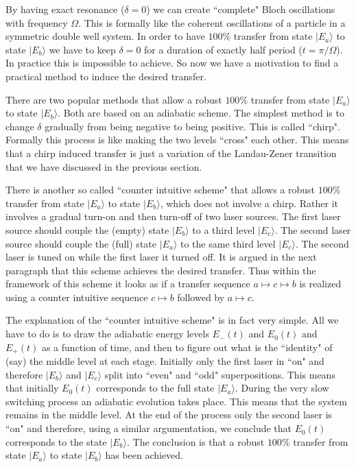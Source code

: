 \documentclass[onecolumn,fleqn, 11pt]{revtex4}
\begin{document}
By having exact resonance ($\delta=0$) we can 
create ``complete" Bloch oscillations with 
frequency $\Omega$. This is formally like the 
coherent oscillations of a particle 
in a symmetric double well system. 
In order to have $100\%$ transfer from 
state $|E_a\rangle$ to state $|E_b\rangle$ 
we have to keep $\delta=0$ for a duration 
of exactly half period (${t=\pi/\Omega}$). 
In practice this is impossible to achieve.
So now we have a motivation to find 
a practical method to induce the desired 
transfer. 



There are two popular methods  
that allow a robust $100\%$ transfer from 
state $|E_a\rangle$ to state $|E_b\rangle$. 
Both are based on an adiabatic scheme.
The simplest method is to change $\delta$ gradually  
from being negative to being positive. 
This is called ``chirp". Formally this 
process is like making the two levels ``cross" 
each other. This means that a chirp induced transfer 
is just a variation of the Landau-Zener 
transition that we have discussed in the previous section.


There is another so called ``counter intuitive scheme" 
that allows a robust $100\%$ transfer from 
state $|E_a\rangle$ to state $|E_b\rangle$, 
which does not involve a chirp. 
Rather it involves a gradual turn-on 
and then turn-off of two laser sources. 
The first laser source should couple 
the (empty) state $|E_b\rangle$ to a  
third level $|E_c\rangle$. 
The second  laser source should couple 
the (full) state $|E_a\rangle$ to  
the same third level $|E_c\rangle$. 
The second laser is tuned on while 
the first laser it turned off. 
It is argued in the next paragraph that 
this scheme achieves the desired transfer. 
Thus within the framework of this scheme 
it looks as if a transfer 
sequence ${a\mapsto c\mapsto b}$ 
is realized using a counter intuitive 
sequence ${c\mapsto b}$ followed by ${a\mapsto c}$. 



The explanation of the ``counter intuitive scheme"  
is in fact very simple. All we have to do is to 
draw the adiabatic energy levels $E_{-}(t)$ 
and $E_0(t)$ and $E_{+}(t)$ as a function of time, 
and then to figure out what is the ``identity" 
of (say) the middle level at each stage. 
Initially only the first laser in ``on" 
and therefore $|E_b\rangle$ and $|E_c\rangle$ 
split into ``even" and ``odd" superpositions. 
This means that initially $E_0(t)$ corresponds  
to the full state $|E_a\rangle$. 
During the very slow switching process 
an adiabatic evolution takes place.  
This means that the system remains in the middle 
level. At the end of the process only the second 
laser is ``on" and therefore, using a similar 
argumentation, we conclude that $E_0(t)$ corresponds  
to the state $|E_b\rangle$. The conclusion is 
that a robust $100\%$ transfer from 
state $|E_a\rangle$ to state $|E_b\rangle$ 
has been achieved.
  
\end{document}
